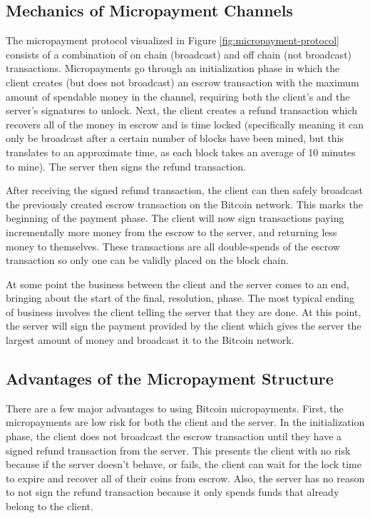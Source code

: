 \subsection{Mechanics of Micropayment Channels}

The micropayment protocol visualized in Figure \ref{fig:micropayment-protocol} consists of a combination of on chain (broadcast) and off chain (not broadcast) transactions. Micropayments go through an initialization phase in which the client creates (but does not broadcast) an escrow transaction with the maximum amount of spendable money in the channel, requiring both the client's and the server's signatures to unlock. Next, the client creates a refund transaction which recovers all of the money in escrow and is time locked (specifically meaning it can only be broadcast after a certain number of blocks have been mined, but this translates to an approximate time, as each block takes an average of 10 minutes to mine). The server then signs the refund transaction.

After receiving the signed refund transaction, the client can then safely broadcast the previously created escrow transaction on the Bitcoin network. This marks the beginning of the payment phase. The client will now sign transactions paying incrementally more money from the escrow to the server, and returning less money to themselves. These transactions are all double-spends of the escrow transaction so only one can be validly placed on the block chain.

At some point the business between the client and the server comes to an end, bringing about the start of the final, resolution, phase. The most typical ending of business involves the client telling the server that they are done. At this point, the server will sign the payment provided by the client which gives the server the largest amount of money and broadcast it to the Bitcoin network.

\subsection{Advantages of the Micropayment Structure}

There are a few major advantages to using Bitcoin micropayments. First, the micropayments are low risk for both the client and the server. In the initialization phase, the client does not broadcast the escrow transaction until they have a signed refund transaction from the server. This presents the client with no risk because if the server doesn't behave, or fails, the client can wait for the lock time to expire and recover all of their coins from escrow. Also, the server has no reason to not sign the refund transaction because it only spends funds that already belong to the client.

